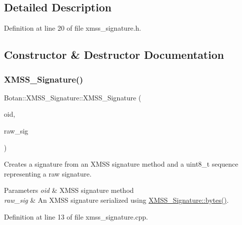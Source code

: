 \subsection{Detailed Description}


Definition at line 20 of file xmss\+\_\+signature.\+h.



\subsection{Constructor \& Destructor Documentation}
\mbox{\label{class_botan_1_1_x_m_s_s___signature_ad35df28bc61392baa698ce09e9eae178}} 
\subsubsection{\texorpdfstring{X\+M\+S\+S\+\_\+\+Signature()}{XMSS\_Signature()}\hspace{0.1cm}{\footnotesize\ttfamily [1/3]}}
{\footnotesize\ttfamily Botan\+::\+X\+M\+S\+S\+\_\+\+Signature\+::\+X\+M\+S\+S\+\_\+\+Signature (\begin{DoxyParamCaption}\item[{X\+M\+S\+S\+\_\+\+Parameters\+::xmss\+\_\+algorithm\+\_\+t}]{oid,  }\item[{const secure\+\_\+vector$<$ uint8\+\_\+t $>$ \&}]{raw\+\_\+sig }\end{DoxyParamCaption})}

Creates a signature from an X\+M\+SS signature method and a uint8\+\_\+t sequence representing a raw signature.


\begin{DoxyParams}{Parameters}
{\em oid} & X\+M\+SS signature method \\
\hline
{\em raw\+\_\+sig} & An X\+M\+SS signature serialized using \mbox{\hyperlink{class_botan_1_1_x_m_s_s___signature_ab3e591e64d2988865b58ea7885258cf6}{X\+M\+S\+S\+\_\+\+Signature\+::bytes()}}. \\
\hline
\end{DoxyParams}


Definition at line 13 of file xmss\+\_\+signature.\+cpp.

